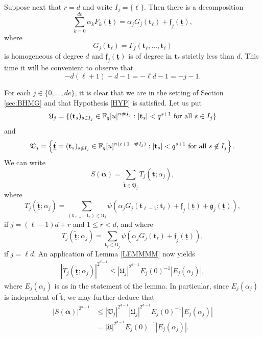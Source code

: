 \documentclass[12pt, reqno]{amsart}
\numberwithin{equation}{section}
\newcommand{\0}{\mathbf{0}}
\newcommand{\FF}{\mathbb{F}}
\renewcommand{\leq}{\leqslant}
\newcommand{\bal}{\boldsymbol{\alpha}}
\renewcommand{\=}{\equiv}
\renewcommand{\t}{\mathbf{t}}
\newcommand{\1}{\mathbf{1}}
\theoremstyle{definition}
\begin{document}
Suppose next that  $r = d$ and write $I_j=\{\ell\}$.
Then there is a decomposition
$$
\sum_{k =  0 }^{d e }  \alpha_k F_k(  \underline{\t})  =  \alpha_j G_j(\t_{\ell} ) + \mathfrak{f}_j (\underline{\t}),
$$
where
$$
G_j (\t_{\ell} ) =  \Gamma_f (\t_{\ell}, \dots, \t_{\ell} )
$$
is homogeneous of degree $d$ and $\mathfrak{f}_j (\underline{\t})$ is of degree in $\t_\ell$ strictly less than $d$.
This time it will be convenient to observe that
\begin{equation}
\label{j2}
- d (\ell + 1) + d - 1 = - \ell d - 1 = - j - 1.
\end{equation}


For each $j\in \{0,\dots, de\}$, it is clear that we are in the setting of Section \ref{sec:BHMG}
and that  Hypothesis \ref{HYP} is satisfied.
Let us put 
$$
\mathfrak{U}_{j} = \{  (\t_s)_{s \in I_j}  \in   \FF_q[u]^{ n \# I_j }:   |\t_{s}| < q^{s + 1} \textnormal{ for all  $s \in I_j$}  \}
$$
and
$$
\mathfrak{V}_{j} =  \left\{  \underline{ \widetilde{\t} } = (\t_s)_{s \notin I_j}  \in   \FF_q[u]^{ n (e + 1-  \# I_j) }:   |\t_{s}| < q^{s + 1} \textnormal{ for all  $s \not \in I_j$}  \right\}.
$$
We can write
$$
S(\bal) = \sum_{  \widetilde{ \underline{\t} } \in \mathfrak{V}_{j}  } T_{j}(\widetilde{ \underline{\t} }; \alpha_{j} ),
$$
where
$$
T_{j}(\widetilde{ \underline{\t} }; \alpha_{j})
=
  \sum_{ (\t_{\ell - 1}, \t_{\ell} ) \in  \mathfrak{U}_{j}  } \psi(  \alpha_j G_j(\t_{\ell - 1} ;  \t_{\ell} ) + \mathfrak{f}_j (\underline{\t} ) + \mathfrak{g}_j (\underline{\t}) ) ,
$$
if $j = (\ell - 1) d + r$ and $1 \leq r < d$, and where 
$$
T_{j}(\widetilde{ \underline{\t} }; \alpha_{j})
=
  \sum_{ \t_{\ell} \in  \mathfrak{U}_{j}  } \psi(  \alpha_j G_j(\t_{\ell} ) + \mathfrak{f}_j (\underline{\t} )  ) ,
  $$
  if $j = \ell d $.
An application of Lemma \ref{LEMMMM} now yields
\begin{align*}
|T_{j}(\widetilde{ \underline{\t} }; \alpha_{j}) |^{2^{d-1}} \leq   |\mathfrak{U}_{j}|^{2^{d-1}}
E_{j}(0)^{ - 1 }  |E_{j}(\alpha_{j})|,
\end{align*}
where $E_{j}(\alpha_{j})$ is as in the statement of the lemma. In particular, since $E_{j}(\alpha_{j})$
is independent of $\widetilde{ \underline{\t} }$, we may further deduce that
\begin{align*}
|S(\bal)|^{2^{d-1}} &\leq  |\mathfrak{V}_{j}|^{2^{d-1}}   |\mathfrak{U}_{j}|^{2^{d-1}}
E_{j}(0)^{ - 1 }  |E_{j}(\alpha_{j})|
\\
&=
|\mathfrak{U}|^{2^{d-1}}
E_{j}(0)^{ - 1 }  |E_{j}(\alpha_{j})|.
\end{align*}
\end{document}
